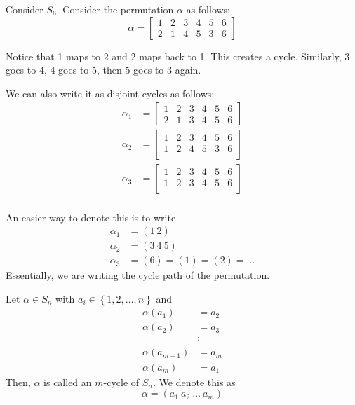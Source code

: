 \begin{nexample}
    Consider \(S_6\). Consider the permutation \(\alpha\) as follows:
    \[
        \alpha = \begin{bmatrix}
            1 & 2 & 3 & 4 & 5 & 6 \\
            2 & 1 & 4 & 5 & 3 & 6
        \end{bmatrix}
    \]

    Notice that 1 maps to 2 and 2 maps back to 1. This creates a cycle. Similarly, 3 goes to 4, 4 goes to 5, then 5 goes to 3 again.

    We can also write it as disjoint cycles as follows:
    \[
    \begin{aligned}
        \alpha_1 &= \begin{bmatrix}
            1 & 2 & 3 & 4 & 5 & 6 \\
            2 & 1 & 3 & 4 & 5 & 6
        \end{bmatrix} \\
        \alpha_2 &= \begin{bmatrix}
            1 & 2 & 3 & 4 & 5 & 6 \\
            1 & 2 & 4 & 5 & 3 & 6 \\
        \end{bmatrix} \\
        \alpha_3 &= \begin{bmatrix}
            1 & 2 & 3 & 4 & 5 & 6 \\
            1 & 2 & 3 & 4 & 5 & 6 \\
        \end{bmatrix} \\
    \end{aligned}
    \]

    An easier way to denote this is to write 
    \[
    \begin{aligned}
        \alpha_1 &= (1 \ 2) \\
        \alpha_2 &= (3 \ 4 \ 5) \\
        \alpha_3 &= (6) = (1) = (2) = \ldots
    \end{aligned}
    \]
    Essentially, we are writing the cycle path of the permutation.
\end{nexample}

\begin{definition}
    Let \(\alpha \in S_n\) with \(a_i \in \left\{1, 2, \ldots, n\right\}\) and
    \[
    \begin{aligned}
        \alpha(a_1) &= a_2 \\
        \alpha(a_2) &= a_3 \\
                    &\vdots \\
        \alpha(a_{m-1}) &= a_m \\
        \alpha(a_m) &= a_1
    \end{aligned}
    \]
    Then, \(\alpha\) is called an \(m\)-cycle of \(S_n\). We denote this as
    \[
        \alpha = (a_1\ a_2\ \ldots\ a_m)
    \]
\end{definition}

